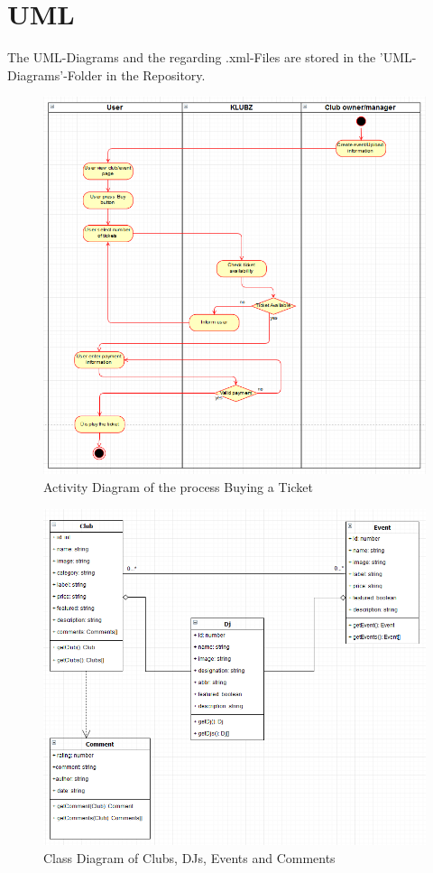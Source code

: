 \documentclass[12pt]{article}
\begin{document}
\section{UML}
The UML-Diagrams and the regarding .xml-Files are stored in the 'UML-Diagrams'-Folder in the Repository.

\begin{figure}[H]
  \centering
    \includegraphics[width=1\textwidth]{figures/ActivityDiagram.png}
    \caption{Activity Diagram of the process Buying a Ticket}
\end{figure}

\begin{figure}[H]
  \centering
    \includegraphics[width=1\textwidth]{figures/ClassDiagram.png}
    \caption{Class Diagram of Clubs, DJs, Events and Comments}
\end{figure}
\end{document}
